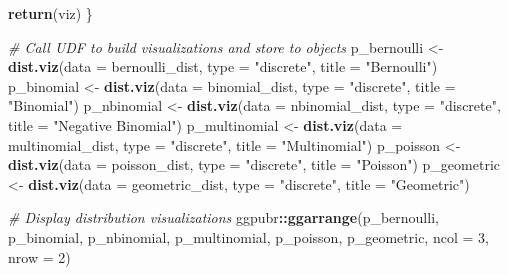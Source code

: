\documentclass[]{book}
\newenvironment{Shaded}{\begin{snugshade}}{\end{snugshade}}
\newcommand{\CommentTok}[1]{\textcolor[rgb]{0.56,0.35,0.01}{\textit{#1}}}
\newcommand{\DataTypeTok}[1]{\textcolor[rgb]{0.13,0.29,0.53}{#1}}
\newcommand{\DecValTok}[1]{\textcolor[rgb]{0.00,0.00,0.81}{#1}}
\newcommand{\KeywordTok}[1]{\textcolor[rgb]{0.13,0.29,0.53}{\textbf{#1}}}
\newcommand{\NormalTok}[1]{#1}
\newcommand{\OperatorTok}[1]{\textcolor[rgb]{0.81,0.36,0.00}{\textbf{#1}}}
\newcommand{\StringTok}[1]{\textcolor[rgb]{0.31,0.60,0.02}{#1}}
\begin{document}
\begin{Shaded}
\begin{Highlighting}[]
  \KeywordTok{return}\NormalTok{(viz)}
\NormalTok{\}}

\CommentTok{# Call UDF to build visualizations and store to objects}
\NormalTok{p_bernoulli <-}\StringTok{ }\KeywordTok{dist.viz}\NormalTok{(}\DataTypeTok{data =}\NormalTok{ bernoulli_dist, }\DataTypeTok{type =} \StringTok{"discrete"}\NormalTok{, }\DataTypeTok{title =} \StringTok{"Bernoulli"}\NormalTok{)}
\NormalTok{p_binomial <-}\StringTok{ }\KeywordTok{dist.viz}\NormalTok{(}\DataTypeTok{data =}\NormalTok{ binomial_dist, }\DataTypeTok{type =} \StringTok{"discrete"}\NormalTok{, }\DataTypeTok{title =} \StringTok{"Binomial"}\NormalTok{)}
\NormalTok{p_nbinomial <-}\StringTok{ }\KeywordTok{dist.viz}\NormalTok{(}\DataTypeTok{data =}\NormalTok{ nbinomial_dist, }\DataTypeTok{type =} \StringTok{"discrete"}\NormalTok{, }\DataTypeTok{title =} \StringTok{"Negative Binomial"}\NormalTok{)}
\NormalTok{p_multinomial <-}\StringTok{ }\KeywordTok{dist.viz}\NormalTok{(}\DataTypeTok{data =}\NormalTok{ multinomial_dist, }\DataTypeTok{type =} \StringTok{"discrete"}\NormalTok{, }\DataTypeTok{title =} \StringTok{"Multinomial"}\NormalTok{)}
\NormalTok{p_poisson <-}\StringTok{ }\KeywordTok{dist.viz}\NormalTok{(}\DataTypeTok{data =}\NormalTok{ poisson_dist, }\DataTypeTok{type =} \StringTok{"discrete"}\NormalTok{, }\DataTypeTok{title =} \StringTok{"Poisson"}\NormalTok{)}
\NormalTok{p_geometric <-}\StringTok{ }\KeywordTok{dist.viz}\NormalTok{(}\DataTypeTok{data =}\NormalTok{ geometric_dist, }\DataTypeTok{type =} \StringTok{"discrete"}\NormalTok{, }\DataTypeTok{title =} \StringTok{"Geometric"}\NormalTok{)}
  
\CommentTok{# Display distribution visualizations}
\NormalTok{ggpubr}\OperatorTok{::}\KeywordTok{ggarrange}\NormalTok{(p_bernoulli, p_binomial, p_nbinomial, p_multinomial, p_poisson, p_geometric,}
          \DataTypeTok{ncol =} \DecValTok{3}\NormalTok{, }\DataTypeTok{nrow =} \DecValTok{2}\NormalTok{)}
\end{Highlighting}
\end{Shaded}
\end{document}
